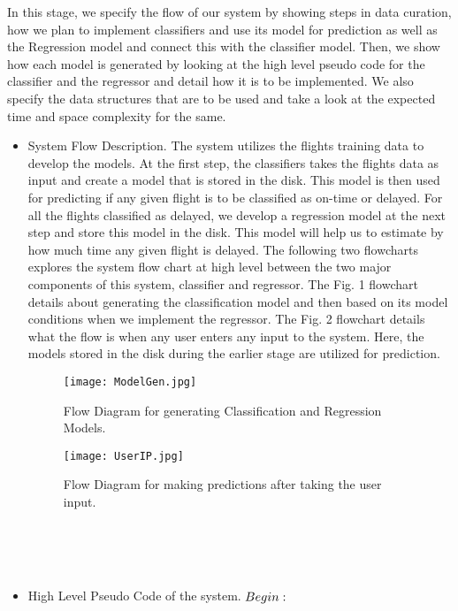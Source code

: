 \textnormal{
In this stage, we specify the flow of our system by showing steps in data curation, how we plan to implement classifiers and use its model for prediction as well as the Regression model and connect this with the classifier model. Then, we show how each model is generated by looking at the high level pseudo code for the classifier and the regressor and detail how it is to be implemented. We also specify the data structures that are to be used and take a look at the expected time and space complexity for the same.\\ }
\begin{itemize} 
\item{  System Flow Description. }
The system utilizes the flights training data to develop the models. At the first step, the classifiers takes the flights data as input and create a model that is stored in the disk. This model is then used for predicting if any given flight is to be classified as on-time or delayed. For all the flights classified as delayed, we develop a regression model at the next step and store this model in the disk. This model will help us to estimate by how much time any given flight is delayed. The following two flowcharts explores the system flow chart at high level between the two major components of this system, classifier and regressor. The Fig. 1 flowchart details about generating the classification model and then based on its model conditions when we implement the regressor. The Fig. 2 flowchart details what the flow is when any user enters any input to the system. Here, the models stored in the disk during the earlier stage are utilized for prediction.  
\begin{figure}
\texttt{[image: ModelGen.jpg]}
\caption{Flow Diagram for generating Classification and Regression Models.}
\end{figure}
\begin{figure}
\texttt{[image: UserIP.jpg]}
\caption{Flow Diagram for making predictions after taking the user input.}
\end{figure}
\\
\\
\\
\item{ High Level Pseudo Code of the system. }
$\\Begin:$


\end{itemize}
